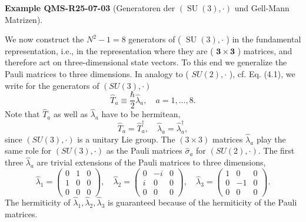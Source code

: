 \documentclass[10pt, letterpaper]{article}
\newcommand{\CustomHeading}[3]{%
  \par\medskip\noindent%
  \textbf{#1 #2} \textnormal{(#3)}.\enskip%
}
\newenvironment{EXA}[2]{\begin{unitbox}\CustomHeading{Example}{#1}{#2}}{\end{unitbox}}
\begin{document}
\begin{EXA}{QMS-R25-07-03}{Generatoren der $(\operatorname{SU}(3), \cdot)$ und Gell-Mann Matrizen}
We now construct the $N^{2}-1=8$ generators of ( $\operatorname{SU}(3), \cdot$ ) in the fundamental representation, i.e., in the representation where they are ( $\mathbf{3} \times \mathbf{3}$ ) matrices, and therefore act on three-dimensional state vectors. To this end we generalize the Pauli matrices to three dimensions. In analogy to ( $S U(2), \cdot$ ), cf. Eq. (4.1), we write for the generators of $(S U(3), \cdot)$
$$
\hat{T}_{a} \equiv \frac{\hbar}{2} \hat{\lambda}_{a}, \quad a=1, \ldots, 8 .
$$
Note that $\hat{T}_{a}$ as well as $\hat{\lambda}_{a}$ have to be hermitean,
$$
\hat{T}_{a}=\hat{T}_{a}^{\dagger}, \quad \hat{\lambda}_{a}=\hat{\lambda}_{a}^{\dagger},
$$
since $(S U(3), \cdot)$ is a unitary Lie group. The $(3 \times 3)$ matrices $\hat{\lambda}_{a}$ play the same role for $(S U(3), \cdot)$ as the Pauli matrices $\hat{\sigma}_{a}$ for $(S U(2), \cdot)$. The first three $\hat{\lambda}_{a}$ are trivial extensions of the Pauli matrices to three dimensions,
$$
\hat{\lambda}_{1}=\left(\begin{array}{lll}
0 & 1 & 0 \\
1 & 0 & 0 \\
0 & 0 & 0
\end{array}\right), \quad \hat{\lambda}_{2}=\left(\begin{array}{ccc}
0 & -i & 0 \\
i & 0 & 0 \\
0 & 0 & 0
\end{array}\right), \quad \hat{\lambda}_{3}=\left(\begin{array}{ccc}
1 & 0 & 0 \\
0 & -1 & 0 \\
0 & 0 & 0
\end{array}\right) .
$$
The hermiticity of $\hat{\lambda}_{1}, \hat{\lambda}_{2}, \hat{\lambda}_{3}$ is guaranteed because of the hermiticity of the Pauli matrices.


\end{EXA}
\end{document}
